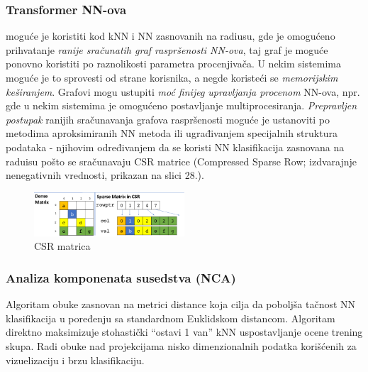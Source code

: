 \documentclass[fontsize=12bp, paper=a4]{scrarticle}
\begin{document}
\subsubsection{Transformer NN-ova}

moguće je koristiti kod kNN i NN zasnovanih na radiusu, gde je omogućeno prihvatanje \textit{ranije sračunatih graf raspršenosti NN-ova}, taj graf je moguće ponovno koristiti po raznolikosti parametra procenjivača. U nekim sistemima moguće je to sprovesti od strane korisnika, a negde koristeći se \textit{memorijskim keširanjem}. Grafovi mogu ustupiti \textit{moć finijeg upravljanja procenom} NN-ova, npr. gde u nekim sistemima je omogućeno postavljanje multiprocesiranja.
\textit{Prepravljen postupak} ranijih sračunavanja grafova raspršenosti moguće je ustanoviti po metodima aproksimiranih NN metoda ili ugrađivanjem specijalnih struktura podataka - njihovim određivanjem da se koristi NN klasifikacija zasnovana na raduisu pošto se sračunavaju CSR matrice (Compressed Sparse Row; izdvarajnje nenegativnih vrednosti, prikazan na slici 28.).\cite{csr}

\begin{figure}[h!]
    \centering
    \includegraphics[width=0.5\textwidth]{image-27.png}
    \caption{CSR matrica}
\end{figure}

\subsubsection{Analiza komponenata susedstva (NCA)}

Algoritam obuke zasnovan na metrici distance koja cilja da poboljša tačnost NN klasifikacija u poređenju sa standardnom Euklidskom distancom. Algoritam direktno maksimizuje stohastički ``ostavi 1 van'' kNN uspostavljanje ocene trening skupa. Radi obuke nad projekcijama nisko dimenzionalnih podatka korišćenih za vizuelizaciju i brzu klasifikaciju.
\end{document}
